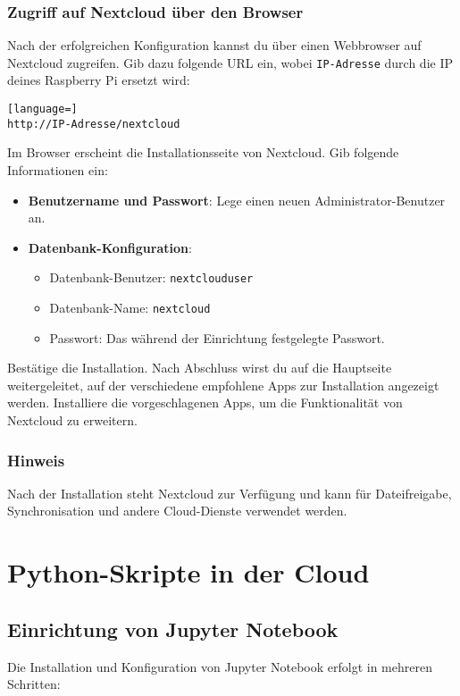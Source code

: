 \documentclass[a4paper,12pt]{article}
\begin{document}
\subsubsection{Zugriff auf Nextcloud über den Browser}
Nach der erfolgreichen Konfiguration kannst du über einen Webbrowser auf Nextcloud zugreifen. Gib dazu folgende URL ein, wobei \texttt{IP-Adresse} durch die IP deines Raspberry Pi ersetzt wird:
\begin{lstlisting}[language=]
http://IP-Adresse/nextcloud
\end{lstlisting}

\noindent
Im Browser erscheint die Installationsseite von Nextcloud. Gib folgende Informationen ein:
\begin{itemize}
    \item \textbf{Benutzername und Passwort}: Lege einen neuen Administrator-Benutzer an.
    \item \textbf{Datenbank-Konfiguration}:
    \begin{itemize}
        \item Datenbank-Benutzer: \texttt{nextclouduser}
        \item Datenbank-Name: \texttt{nextcloud}
        \item Passwort: Das während der Einrichtung festgelegte Passwort.
    \end{itemize}
\end{itemize}

\noindent
Bestätige die Installation. Nach Abschluss wirst du auf die Hauptseite weitergeleitet, auf der verschiedene empfohlene Apps zur Installation angezeigt werden. Installiere die vorgeschlagenen Apps, um die Funktionalität von Nextcloud zu erweitern.

\subsubsection{Hinweis}
Nach der Installation steht Nextcloud zur Verfügung und kann für Dateifreigabe, Synchronisation und andere Cloud-Dienste verwendet werden.

\section{Python-Skripte in der Cloud}
\subsection{Einrichtung von Jupyter Notebook}
Die Installation und Konfiguration von Jupyter Notebook erfolgt in mehreren Schritten:
\end{document}
